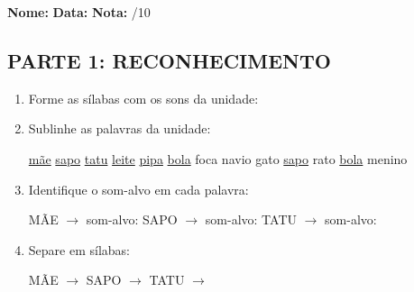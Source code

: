 \begin{exercicio}

\noindent\textbf{Nome:} \underline{\hspace{3.2cm}} \quad \textbf{Data:} \underline{\hspace{1.6cm}} \quad \textbf{Nota:} \underline{\hspace{0.9cm}}/10


\subsection*{PARTE 1: RECONHECIMENTO}

\begin{enumerate}

  \item Forme as sílabas com os sons da unidade:

\begin{center}
\end{center}

  \item Sublinhe as palavras da unidade:

\begin{center}
  \uline{mãe} \quad \uline{sapo} \quad \uline{tatu} \quad \uline{leite} \quad \uline{pipa} \quad \uline{bola} \quad foca \quad navio \quad gato \quad \uline{sapo} \quad rato \quad \uline{bola} \quad menino
\end{center}

  \item Identifique o som-alvo em cada palavra:
  \begin{center}
  MÃE $\rightarrow$ som-alvo: \underline{\hspace{1cm}} \quad SAPO $\rightarrow$ som-alvo: \underline{\hspace{1cm}} \quad TATU $\rightarrow$ som-alvo: \underline{\hspace{1cm}}
  \end{center}

  \item Separe em sílabas:
  \begin{center}
  MÃE $\rightarrow$ \underline{\hspace{1cm}} \quad SAPO $\rightarrow$ \underline{\hspace{1cm}} \quad TATU $\rightarrow$ \underline{\hspace{1cm}}
  \end{center}


\end{enumerate}
\end{exercicio}
